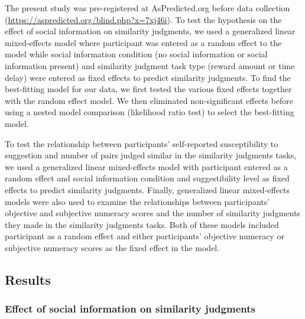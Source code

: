 \documentclass[
  pub,floatsintext]{apa6}
\begin{document}
The present study was pre-registered at AsPredicted.org before data collection (\url{https://aspredicted.org/blind.php?x=7xj46i}). To test the hypothesis on the effect of social information on similarity judgments, we used a generalized linear mixed-effects model where participant was entered as a random effect to the model while social information condition (no social information or social information present) and similarity judgment task type (reward amount or time delay) were entered as fixed effects to predict similarity judgments. To find the best-fitting model for our data, we first tested the various fixed effects together with the random effect model. We then eliminated non-significant effects before using a nested model comparison (likelihood ratio test) to select the best-fitting model.

To test the relationship between participants' self-reported susceptibility to suggestion and number of pairs judged similar in the similarity judgments tasks, we used a generalized linear mixed-effects model with participant entered as a random effect and social information condition and suggestibility level as fixed effects to predict similarity judgments. Finally, generalized linear mixed-effects models were also used to examine the relationships between participants' objective and subjective numeracy scores and the number of similarity judgments they made in the similarity judgments tasks. Both of these models included participant as a random effect and either participants' objective numeracy or subjective numeracy scores as the fixed effect in the model.

\hypertarget{results-2}{%
\subsection{Results}\label{results-2}}

\hypertarget{effect-of-social-information-on-similarity-judgments}{%
\subsubsection{Effect of social information on similarity judgments}\label{effect-of-social-information-on-similarity-judgments}}
\end{document}
